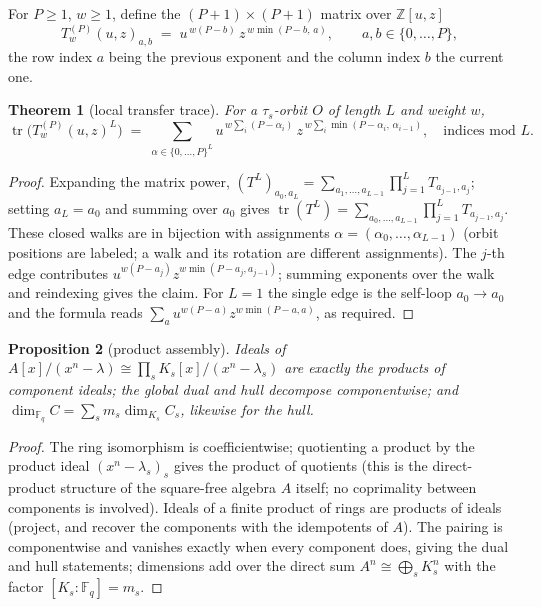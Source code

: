 \documentclass[10pt,journal,draftclsnofoot,onecolumn]{IEEEtran}
\newtheorem{theorem}{Theorem}[section]
\newtheorem{proposition}[theorem]{Proposition}
\theoremstyle{definition}
\theoremstyle{remark}
\newcommand{\Fq}{\mathbb{F}_q}
\newcommand{\Z}{\mathbb{Z}}
\newcommand{\tr}{\operatorname{tr}}
\begin{document}
For \(P \ge 1\), \(w \ge 1\), define the \((P{+}1)\times(P{+}1)\) matrix
over \(\Z[u,z]\)
\[
T^{(P)}_w(u,z)_{a,b} \;=\; u^{\,w(P-b)}\, z^{\,w \min(P-b,\, a)},
\qquad a, b \in \{0,\dots,P\},
\]
the row index \(a\) being the previous exponent and the column index
\(b\) the current one.

\begin{theorem}[local transfer trace]\label{thm:T5}
For a \(\tau_s\)-orbit \(O\) of length \(L\) and weight \(w\),
\[
\tr\!\big(T^{(P)}_w(u,z)^L\big)
\;=\; \sum_{\alpha \in \{0,\dots,P\}^L}
u^{\,w \sum_i (P-\alpha_i)}\,
z^{\,w \sum_i \min(P-\alpha_i,\, \alpha_{i-1})},
\quad \text{indices mod } L.
\]
\end{theorem}

\begin{proof}
Expanding the matrix power,
\((T^L)_{a_0,a_L} = \sum_{a_1,\dots,a_{L-1}} \prod_{j=1}^{L} T_{a_{j-1},a_j}\);
setting \(a_L = a_0\) and summing over \(a_0\) gives
\(\tr(T^L) = \sum_{a_0,\dots,a_{L-1}} \prod_{j=1}^{L} T_{a_{j-1},a_j}\).
These closed walks are in bijection with assignments
\(\alpha = (\alpha_0,\dots,\alpha_{L-1})\) (orbit positions are labeled;
a walk and its rotation are different assignments). The \(j\)-th edge
contributes \(u^{w(P-a_j)} z^{w\min(P-a_j, a_{j-1})}\); summing exponents
over the walk and reindexing gives the claim. For \(L=1\) the single edge
is the self-loop \(a_0 \to a_0\) and the formula reads
\(\sum_a u^{w(P-a)} z^{w\min(P-a,a)}\), as required.
\end{proof}

\begin{proposition}[product assembly]\label{prop:assembly}
Ideals of \(A[x]/(x^n-\lambda) \cong \prod_s K_s[x]/(x^n-\lambda_s)\) are
exactly the products of component ideals; the global dual and hull
decompose componentwise; and
\(\dim_{\Fq} C = \sum_s m_s \dim_{K_s} C_s\), likewise for the hull.
\end{proposition}

\begin{proof}
The ring isomorphism is coefficientwise; quotienting a product by the
product ideal \((x^n-\lambda_s)_s\) gives the product of quotients (this
is the direct-product structure of the square-free algebra \(A\) itself;
no coprimality between components is involved). Ideals of a finite
product of rings are products of ideals (project, and recover the
components with the idempotents of \(A\)). The pairing is componentwise
and vanishes exactly when every component does, giving the dual and hull
statements; dimensions add over the direct sum \(A^n \cong \bigoplus_s
K_s^n\) with the factor \([K_s:\Fq] = m_s\).
\end{proof}
\end{document}
